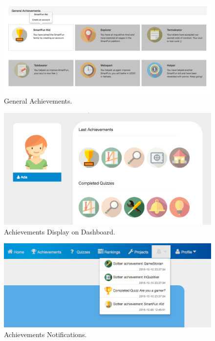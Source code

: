 \begin{figure}
\includegraphics[width=1\linewidth]{images/ui/GeneralAchievements.png}
\caption{General Achievements.}
\label{fig:GeneralAchievements}
\end{figure}

\begin{figure}
\includegraphics[width=1\linewidth]{images/ui/AchievementsDashboard.png}
\caption{Achievements Display on Dashboard.}
\label{fig:AchievementsDashboard}
\end{figure}

\begin{figure}
\includegraphics[width=1\linewidth]{images/ui/AchievementsPopUps.png}
\caption{Achievements Notifications.}
\label{fig:AchievementsPopUps}
\end{figure}


